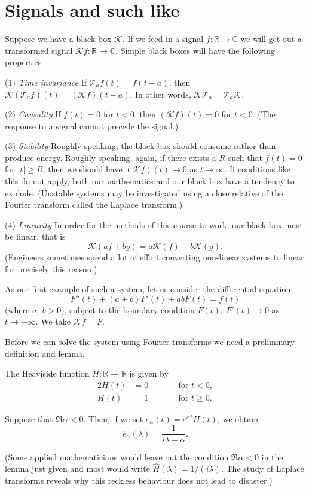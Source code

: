\section{Signals and such like} Suppose we have a black box
${\mathcal K}$. If we feed in a signal 
$f:{\mathbb R}\rightarrow{\mathbb C}$ we will get out
a transformed signal 
${\mathcal K}f:{\mathbb R}\rightarrow{\mathbb C}$.
Simple black boxes will have the following properties

(1) \emph{Time invariance} If ${\mathcal T}_{a}f(t)=f(t-a)$,
then ${\mathcal K}({\mathcal T}_{a}f)(t)=({\mathcal K}f)(t-a)$.
In other words, ${\mathcal K}{\mathcal T}_{a}
={\mathcal T}_{a}{\mathcal K}$.

(2) \emph{Causality} If $f(t)=0$ for $t<0$, then
$({\mathcal K}f)(t)=0$ for $t<0$. (The response
to a signal cannot precede the signal.)

(3) \emph{Stability} Roughly speaking, the black box
should consume rather than produce energy. Roughly
speaking, again, if there exists a $R$ such that
$f(t)=0$ for $|t|\geq R$, then we should have
$({\mathcal K}f)(t)\rightarrow 0$ as $t\rightarrow\infty$.
If conditions like this do not apply, both our mathematics
and our black box have a tendency to explode. 
(Unstable systems may be investigated using a close
relative of the Fourier transform called the Laplace transform.)

(4) \emph{Linearity} In order for the methods of this course
to work, our black box must be linear, that is
\[{\mathcal K}(af+bg)=a{\mathcal K}(f)+b{\mathcal K}(g).\]
(Engineers sometimes spend a lot of effort converting
non-linear systems to linear for precisely this reason.)

As our first example of such a system, let us consider
the differential equation
\begin{equation*}
\tag*{$\bigstar$}
F''(t)+(a+b)F'(t)+ab F(t)=f(t)
\end{equation*}
(where $a,\ b>0$), subject to the boundary condition
$F(t),\ F'(t)\rightarrow 0$ as $t\rightarrow -\infty$. 
We take ${\mathcal K}f=F$.

Before we can solve the system using Fourier transforms
we need a preliminary definition and lemma.
\begin{definition} The Heaviside function
$H:{\mathbb R}\rightarrow{\mathbb R}$ is given by
\begin{alignat*}{2}
H(t)&=0&&\qquad\text{for $t<0$},\\
H(t)&=1&&\qquad\text{for $t\geq 0$.}
\end{alignat*}
\end{definition}
\begin{lemma} Suppose that $\Re \alpha<0$. Then, if we set
$e_{\alpha}(t)=e^{\alpha t}H(t)$, we obtain
\[\hat{e}_{\alpha}(\lambda)=\frac{1}{i\lambda-\alpha}.\]
\end{lemma}
(Some applied mathematicians would leave out
the condition $\Re \alpha<0$ in the lemma
just given and most would write $\hat{H}(\lambda)=1/(i\lambda)$.
The study of Laplace transforms reveals why this reckless
behaviour does not lead to disaster.)

